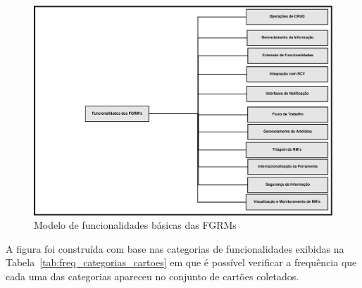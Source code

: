 \begin{figure}[htpb]
	\centering
	\includegraphics[width=1.15\linewidth]{./chapter-estudo-funcionalidades-fgrm/img/diagrama-espectro-funcionalidades-fgrm.pdf}
	\caption{Modelo de funcionalidades básicas das FGRMs}
\label{fig:diagrama-espectro-funcionalidades-fgrm}
\end{figure}

A figura foi construída com base nas categorias de funcionalidades exibidas na
Tabela~\ref{tab:freq_categorias_cartoes} em que é possível verificar a
frequência que cada uma das categorias apareceu no conjunto de cartões
coletados.

\begin{table}[htpb]
\centering
{}
\caption{Frequência de cada categoria de funcionalidade no conjunto de cartões
	obtidos.}
\label{tab:freq_categorias_cartoes}
\end{table}

